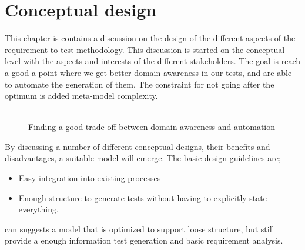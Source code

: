 \chapter{Conceptual design}
This chapter is contains a discussion on the design of the different aspects of the requirement-to-test methodology. This discussion is started on the conceptual level with the aspects and interests of the different stakeholders. The goal is reach a good a point where we get better domain-awareness in our tests, and are able to automate the generation of them. The constraint for not going after the optimum is added meta-model complexity.\\\\
\begin{figure}[!htbp]
\centering

\label{fig:project_parameter_plot_project}
\caption{Finding a good trade-off between domain-awareness and automation}
\end{figure}By discussing a number of different conceptual designs, their benefits and disadvantages, a suitable model will emerge. The basic design guidelines are;
\begin{itemize}
  \item Easy integration into existing processes
  \item Enough structure to generate tests without having to explicitly state everything.
\end{itemize}

can suggests a model that is optimized to support loose structure, but still provide a enough information test generation and basic requirement analysis. %

